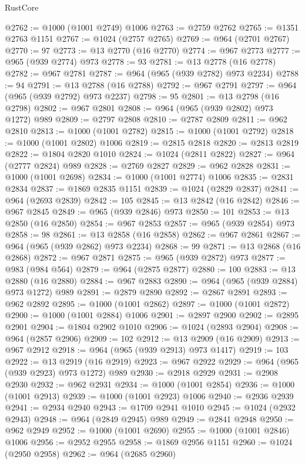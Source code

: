 \begin{lexlean}{RustCore}
\begin{coremodule}
@2762 := @1000 (@1001 @2749) @1006
@2763 := @2759 @2762
@2765 := @1351 @2763 @1151
@2767 := @1024 (@2757 @2765)
@2769 := @964 (@2701 @2767)
@2770 := 97
@2773 := @13 @2770 (@16 @2770)
@2774 := @967 @2773
@2777 := @965 (@939 @2774) @973
@2778 := 93
@2781 := @13 @2778 (@16 @2778)
@2782 := @967 @2781
@2787 := @964 (@965 (@939 @2782) @973 @2234)
@2788 := 94
@2791 := @13 @2788 (@16 @2788)
@2792 := @967 @2791
@2797 := @964 (@965 (@939 @2792) @973 @2237)
@2798 := 95
@2801 := @13 @2798 (@16 @2798)
@2802 := @967 @2801
@2808 := @964 (@965 (@939 @2802) @973 @1272) @989
@2809 := @2797 @2808
@2810 := @2787 @2809
@2811 := @962 @2810
@2813 := @1000 (@1001 @2782)
@2815 := @1000 (@1001 @2792)
@2818 := @1000 (@1001 @2802) @1006
@2819 := @2815 @2818
@2820 := @2813 @2819
@2822 := @1804 @2820 @1010
@2824 := @1024 (@2811 @2822)
@2827 := @964 (@2777 @2824) @989
@2828 := @2769 @2827
@2829 := @962 @2828
@2831 := @1000 (@1001 @2698)
@2834 := @1000 (@1001 @2774) @1006
@2835 := @2831 @2834
@2837 := @1869 @2835 @1151
@2839 := @1024 (@2829 @2837)
@2841 := @964 (@2693 @2839)
@2842 := 105
@2845 := @13 @2842 (@16 @2842)
@2846 := @967 @2845
@2849 := @965 (@939 @2846) @973
@2850 := 101
@2853 := @13 @2850 (@16 @2850)
@2854 := @967 @2853
@2857 := @965 (@939 @2854) @973
@2858 := 98
@2861 := @13 @2858 (@16 @2858)
@2862 := @967 @2861
@2867 := @964 (@965 (@939 @2862) @973 @2234)
@2868 := 99
@2871 := @13 @2868 (@16 @2868)
@2872 := @967 @2871
@2875 := @965 (@939 @2872) @973
@2877 := @983 (@984 @564)
@2879 := @964 (@2875 @2877)
@2880 := 100
@2883 := @13 @2880 (@16 @2880)
@2884 := @967 @2883
@2890 := @964 (@965 (@939 @2884) @973 @1272) @989
@2891 := @2879 @2890
@2892 := @2867 @2891
@2893 := @962 @2892
@2895 := @1000 (@1001 @2862)
@2897 := @1000 (@1001 @2872)
@2900 := @1000 (@1001 @2884) @1006
@2901 := @2897 @2900
@2902 := @2895 @2901
@2904 := @1804 @2902 @1010
@2906 := @1024 (@2893 @2904)
@2908 := @964 (@2857 @2906)
@2909 := 102
@2912 := @13 @2909 (@16 @2909)
@2913 := @967 @2912
@2918 := @964 (@965 (@939 @2913) @973 @1417)
@2919 := 103
@2922 := @13 @2919 (@16 @2919)
@2923 := @967 @2922
@2929 := @964 (@965 (@939 @2923) @973 @1272) @989
@2930 := @2918 @2929
@2931 := @2908 @2930
@2932 := @962 @2931
@2934 := @1000 (@1001 @2854)
@2936 := @1000 (@1001 @2913)
@2939 := @1000 (@1001 @2923) @1006
@2940 := @2936 @2939
@2941 := @2934 @2940
@2943 := @1709 @2941 @1010
@2945 := @1024 (@2932 @2943)
@2948 := @964 (@2849 @2945) @989
@2949 := @2841 @2948
@2950 := @962 @2949
@2952 := @1000 (@1001 @2690)
@2955 := @1000 (@1001 @2846) @1006
@2956 := @2952 @2955
@2958 := @1869 @2956 @1151
@2960 := @1024 (@2950 @2958)
@2962 := @964 (@2685 @2960)

\end{coremodule}
\end{lexlean}
